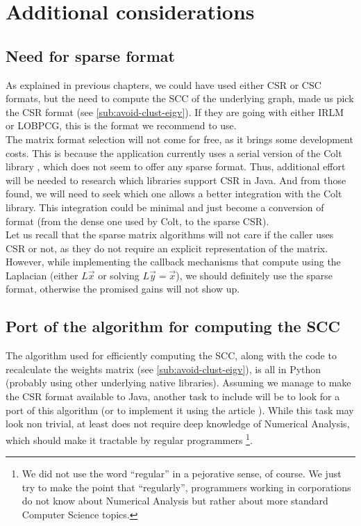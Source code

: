 \section{Additional considerations}

\subsection{Need for sparse format}

As explained in previous chapters, we 
could have used either CSR or CSC formats, but the need to compute the
\gls{SCC} of the underlying graph, made us pick the CSR
format (see \cref{sub:avoid-clust-eigv}). If they are going with
either \gls{IRLM} or \gls{LOBPCG}, this is the format we recommend to use. \\


The matrix format selection will not come for free, as it brings
some development costs. 
This is because the application currently uses a serial version of the
Colt library \cite{colt}, which does not 
seem to offer any sparse format. Thus, additional effort will be
needed to research which libraries support CSR in Java. And from those
found, we will need to seek which one allows a better integration with
the Colt library. This integration could be minimal and just become a
conversion of format (from the dense one used by Colt, to the sparse
CSR).  \\

Let us recall that the sparse matrix algorithms will not care if the caller uses
CSR or not, as they do not require an explicit representation of the
matrix. However, while implementing the callback mechanisms that 
compute using the \gls{Laplacian} (either $L\vec{x}$ or solving $L\vec{y} =
\vec{x}$), we should definitely use the sparse format, otherwise the
promised gains will not show up.

\subsection{Port of the algorithm for computing the \gls{SCC}}

The algorithm used for efficiently computing the \gls{SCC}, along with the
code to recalculate the weights matrix (see
\cref{sub:avoid-clust-eigv}), is all in Python (probably 
using other underlying native libraries). Assuming we manage to make the CSR
format available to Java, another task to include will be to look for
a port of this algorithm (or to implement it using the article
\cite{pearce05}). While this task may look non trivial, at least does
not require deep knowledge of Numerical Analysis, which should make it
tractable by regular programmers \footnote{We did not use the
word ``regular'' in a pejorative sense, of course. We just try to make
the point that ``regularly'', programmers working in corporations do
not know about Numerical Analysis but rather about more standard
Computer Science topics.}.

